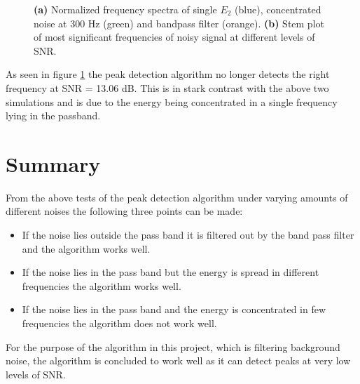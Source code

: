 \begin{figure}[H]
\begin{subfigure}{0.49\textwidth}
\caption{}
\label{fig:concentrated_stem}
\end{subfigure}
\caption{\textbf{(a)} Normalized frequency spectra of single $E_2$ (blue), concentrated noise at 300 Hz (green) and bandpass filter (orange). \textbf{(b)} Stem plot of most significant frequencies of noisy signal at different levels of SNR.}
\label{fig:concentrated_noise}
\end{figure}

As seen in figure \ref{fig:concentrated_stem} the peak detection algorithm no longer detects the right frequency at SNR = 13.06 dB. This is in stark contrast with the above two simulations and is due to the energy being concentrated in a single frequency lying in the passband.

\section{Summary}
From the above tests of the peak detection algorithm under varying amounts of different noises the following three points can be made:
\begin{itemize}
\item If the noise lies outside the pass band it is filtered out by the band pass filter and the algorithm works well.
\item If the noise lies in the pass band but the energy is spread in different frequencies the algorithm works well.
\item If the noise lies in the pass band and the energy is concentrated in few frequencies the algorithm does not work well.
\end{itemize}
For the purpose of the algorithm in this project, which is filtering background noise, the algorithm is concluded to work well as it can detect peaks at very low levels of SNR.